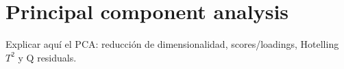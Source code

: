 \section{Principal component analysis}
\label{sec:pca}

Explicar aquí el PCA: reducción de dimensionalidad, scores/loadings, Hotelling $T^2$ y Q residuals.

